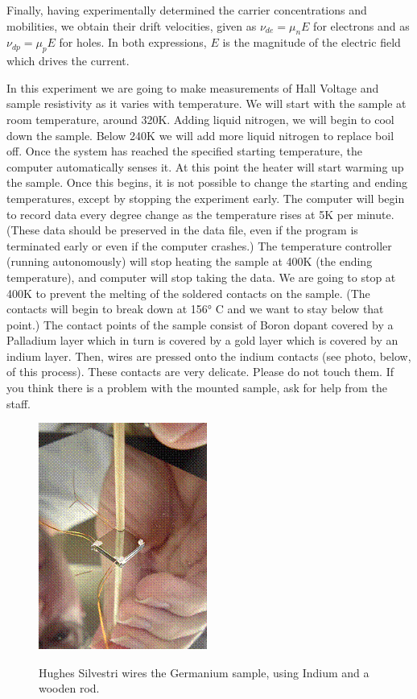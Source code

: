 \documentclass{../lab}
\begin{document}
Finally, having experimentally determined the carrier concentrations and mobilities, we obtain their drift velocities, given as $\nu_{de} = \mu_n E$ for electrons and as $\nu_{dp} = \mu_p E$ for holes. In both expressions, $E$ is the magnitude of the electric field which drives the current.

In this experiment we are going to make measurements of Hall Voltage and sample resistivity as it varies with temperature. We will start with the sample at room temperature, around 320K. Adding liquid nitrogen, we will begin to cool down the sample. Below 240K we will add more liquid nitrogen to replace boil off. Once the system has reached the specified starting temperature, the computer automatically senses it. At this point the heater will start warming up the sample. Once this begins, it is not possible to change the starting and ending temperatures, except by stopping the experiment early. The computer will begin to record data every degree change as the temperature rises at 5K per minute. (These data should be preserved in the data file, even if the program is terminated early or even if the computer crashes.) The temperature controller (running autonomously) will stop heating the sample at 400K (the ending temperature), and computer will stop taking the data. We are going to stop at 400K to prevent the melting of the soldered contacts on the sample. (The contacts will begin to break down at 156° C and we want to stay below that point.) The contact points of the sample consist of Boron dopant covered by a Palladium layer which in turn is covered by a gold layer which is covered by an indium layer. Then, wires are pressed onto the indium contacts (see photo, below, of this process). These contacts are very delicate. Please do not touch them. If you think there is a problem with the mounted sample, ask for help from the staff.

\begin{figure}[h]
    \centering
    \href{http://experimentationlab.berkeley.edu/sites/default/files/images/SHEimage099.gif}{\includegraphics[width=0.4\linewidth]{images/SHEimage099.png}}
    \caption{Hughes Silvestri wires the Germanium sample, using Indium and a wooden rod.}
    \label{fig:SHEimage099}
\end{figure}
\end{document}
